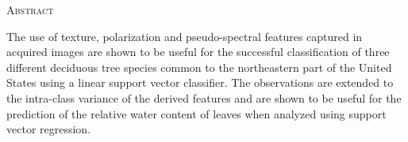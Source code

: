 \begin{center}
  \textsc{Abstract}
\end{center}
%
\noindent
%
The use of texture, polarization and pseudo-spectral features captured in
acquired images are shown to be useful for the successful classification of
three different deciduous tree species common to the northeastern part of the
United States using a linear support vector classifier. The observations
are extended to the intra-class variance of the derived features and are shown
to be useful for the prediction of the relative water content of leaves when
analyzed using support vector regression.
